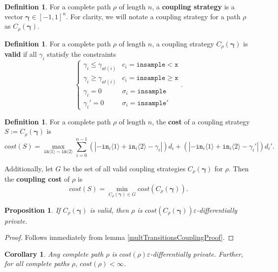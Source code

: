 \documentclass[12pt]{article}
\newcommand{\gguard}[1][x]{\texttt{insample}\geq #1}
\newcommand{\lguard}[1][x]{\texttt{insample} < #1}
\newcommand{\brangle}[1]{\langle #1 \rangle}
\newtheorem{prop}[thm]{Proposition}
\newtheorem{cor}[thm]{Corollary}
\theoremstyle{definition}
\newtheorem{defn}[thm]{Definition}
\begin{document}
\begin{defn}
    For a complete path $\rho$ of length $n$, a \textbf{coupling strategy} is a vector $\bm{\gamma}\in [-1, 1]^n$. For clarity, we will notate a coupling strategy for a path $\rho$ as $C_\rho(\bm{\gamma})$.
\end{defn}

\begin{defn}
    For a complete path $\rho$ of length $n$, a coupling strategy $C_\rho(\bm{\gamma})$ is \textbf{valid} if all $\gamma_i$ statisfy the constraints \[
        \begin{cases}
          \gamma_i\leq\gamma_{at(i)} & c_i = \lguard[\texttt{x}]\\
          \gamma_i\geq\gamma_{at(i)} & c_i = \gguard[\texttt{x}]\\
          \gamma_i=0 & \sigma_i = \texttt{insample}\\
          \gamma_i'=0 & \sigma_i = \texttt{insample}'
        \end{cases}.
      \]
\end{defn}

\begin{defn}
    For a complete path $\rho$ of length $n$, the \textbf{cost} of a coupling strategy $S := C_\rho(\bm{\gamma})$ is \[cost(S) = \max_{\texttt{in}\brangle{1}\sim\texttt{in}\brangle{2}}\sum_{i=0}^{n-1}(|-\texttt{in}_i\brangle{1}+\texttt{in}_i\brangle{2}-\gamma_i|)d_i+(|-\texttt{in}_i\brangle{1}+\texttt{in}_i\brangle{2}-\gamma_i'|)d_i'.\]

    Additionally, let $G$ be the set of all valid coupling strategies $C_\rho(\bm{\gamma})$ for $\rho$. Then the \textbf{coupling cost} of $\rho$ is 
    \[cost(S) = \min_{C_\rho(\bm{\gamma})\in G}cost(C_\rho(\bm{\gamma})).\]
\end{defn}

\begin{prop}
    If $C_\rho(\bm{\gamma})$ is valid, then $\rho$ is $cost(C_\rho(\bm{\gamma}))\varepsilon$-differentially private.
\end{prop}

\begin{proof}
    Follows immediately from lemma \ref{multTransitionsCouplingProof}.
\end{proof}

\begin{cor}
    Any complete path $\rho$ is $cost(\rho)\varepsilon$-differentially private. Further, for all complete paths $\rho$, $cost(\rho)<\infty$. 
\end{cor}
\end{document}
